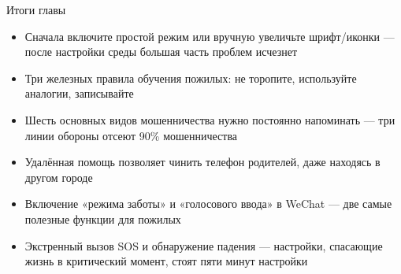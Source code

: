 \begin{tcbsummary}{Итоги главы}
\begin{itemize}
  \item Сначала включите простой режим или вручную увеличьте шрифт/иконки — после настройки среды большая часть проблем исчезнет
  \item Три железных правила обучения пожилых: не торопите, используйте аналогии, записывайте
  \item Шесть основных видов мошенничества нужно постоянно напоминать — три линии обороны отсеют 90\% мошенничества
  \item Удалённая помощь позволяет чинить телефон родителей, даже находясь в другом городе
  \item Включение «режима заботы» и «голосового ввода» в WeChat — две самые полезные функции для пожилых
  \item Экстренный вызов SOS и обнаружение падения — настройки, спасающие жизнь в критический момент, стоят пяти минут настройки
\end{itemize}

\end{tcbsummary}
